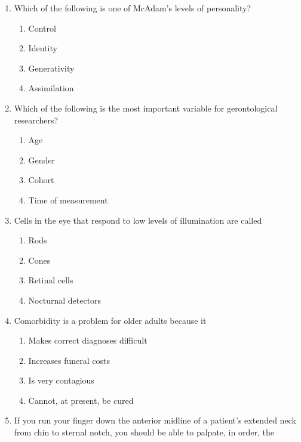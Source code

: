 \documentclass[12pt]{article}
\begin{document}
\begin{enumerate}[label=\arabic*.]
\begin{enumerate}[label=(\alph*)]
    \item Part of a cycle of mosquitoes biting humans and monkeys in forested areas
    \item A mutant of the YF virus
    \item A YF species that has adapted to new mosquitoes
\end{enumerate}
\item Which of the following is one of McAdam's levels of personality?
\begin{enumerate}[label=(\alph*)]
    \item Control
    \item Identity
    \item Generativity
    \item Assimilation
\end{enumerate}
\item Which of the following is the most important variable for gerontological researchers?
\begin{enumerate}[label=(\alph*)]
    \item Age
    \item Gender
    \item Cohort
    \item Time of measurement
\end{enumerate}
\item Cells in the eye that respond to low levels of illumination are called
\begin{enumerate}[label=(\alph*)]
    \item Rods
    \item Cones
    \item Retinal cells
    \item Nocturnal detectors
\end{enumerate}
\item Comorbidity is a problem for older adults because it
\begin{enumerate}[label=(\alph*)]
    \item Makes correct diagnoses difficult
    \item Increases funeral costs
    \item Is very contagious
    \item Cannot, at present, be cured
\end{enumerate}
\item If you run your finger down the anterior midline of a patient's extended neck from chin to sternal notch, you should be able to palpate, in order, the
\begin{enumerate}[label=(\alph*)]

\end{enumerate}
\end{enumerate}
\end{document}
